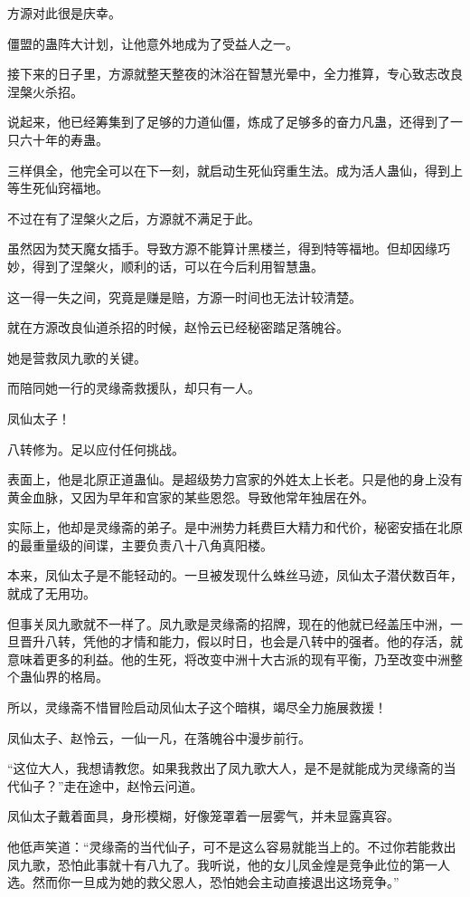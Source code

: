\begin{this_body}
方源对此很是庆幸。

僵盟的蛊阵大计划，让他意外地成为了受益人之一。

接下来的日子里，方源就整天整夜的沐浴在智慧光晕中，全力推算，专心致志改良涅槃火杀招。

说起来，他已经筹集到了足够的力道仙僵，炼成了足够多的奋力凡蛊，还得到了一只六十年的寿蛊。

三样俱全，他完全可以在下一刻，就启动生死仙窍重生法。成为活人蛊仙，得到上等生死仙窍福地。

不过在有了涅槃火之后，方源就不满足于此。

虽然因为焚天魔女插手。导致方源不能算计黑楼兰，得到特等福地。但却因缘巧妙，得到了涅槃火，顺利的话，可以在今后利用智慧蛊。

这一得一失之间，究竟是赚是赔，方源一时间也无法计较清楚。

就在方源改良仙道杀招的时候，赵怜云已经秘密踏足落魄谷。

她是营救凤九歌的关键。

而陪同她一行的灵缘斋救援队，却只有一人。

凤仙太子！

八转修为。足以应付任何挑战。

表面上，他是北原正道蛊仙。是超级势力宫家的外姓太上长老。只是他的身上没有黄金血脉，又因为早年和宫家的某些恩怨。导致他常年独居在外。

实际上，他却是灵缘斋的弟子。是中洲势力耗费巨大精力和代价，秘密安插在北原的最重量级的间谍，主要负责八十八角真阳楼。

本来，凤仙太子是不能轻动的。一旦被发现什么蛛丝马迹，凤仙太子潜伏数百年，就成了无用功。

但事关凤九歌就不一样了。凤九歌是灵缘斋的招牌，现在的他就已经盖压中洲，一旦晋升八转，凭他的才情和能力，假以时日，也会是八转中的强者。他的存活，就意味着更多的利益。他的生死，将改变中洲十大古派的现有平衡，乃至改变中洲整个蛊仙界的格局。

所以，灵缘斋不惜冒险启动凤仙太子这个暗棋，竭尽全力施展救援！

凤仙太子、赵怜云，一仙一凡，在落魄谷中漫步前行。

“这位大人，我想请教您。如果我救出了凤九歌大人，是不是就能成为灵缘斋的当代仙子？”走在途中，赵怜云问道。

凤仙太子戴着面具，身形模糊，好像笼罩着一层雾气，并未显露真容。

他低声笑道：“灵缘斋的当代仙子，可不是这么容易就能当上的。不过你若能救出凤九歌，恐怕此事就十有八九了。我听说，他的女儿凤金煌是竞争此位的第一人选。然而你一旦成为她的救父恩人，恐怕她会主动直接退出这场竞争。”


\end{this_body}
